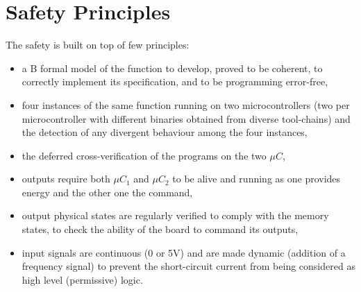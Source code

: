 \section{Safety Principles}
\label{safety:safety-principles}

The safety is built on top of few principles:
\begin{itemize}
    \item a B formal model of the function to develop, proved to be coherent, to correctly implement its specification, and to be programming error-free,
    \item four instances of the same function running on two microcontrollers (two per microcontroller with different binaries obtained from diverse tool-chains) and the detection of any divergent behaviour among the four instances,
    \item the deferred cross-verification of the programs on the two $\mu C$,
    \item outputs require both $\mu C_1$ and $\mu C_2$ to be alive and running as one provides energy and the other one the command,
    \item output physical states are regularly verified to comply with the memory states, to check the ability of the board to command its outputs,
    \item input signals are continuous (0 or 5V) and are made dynamic (addition of a frequency signal) to prevent the short-circuit current from being considered  as high level (permissive) logic.
\end{itemize}

